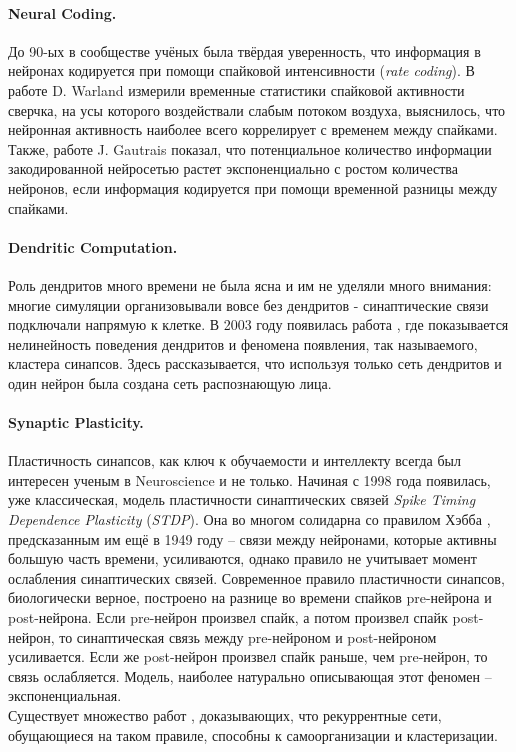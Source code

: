 \documentclass[a4paper,10pt]{article}
\begin{document}
\paragraph*{Neural Coding.} До 90-ых в сообществе учёных была твёрдая уверенность, что информация в нейронах кодируется при помощи спайковой интенсивности (\textit{rate coding}). В работе D. Warland \cite{time_cricket} измерили временные статистики спайковой активности сверчка, на усы которого воздействали слабым потоком воздуха, выяснилось, что нейронная активность наиболее всего коррелирует с временем между спайками. Также, работе J. Gautrais \cite{time_code} показал, что потенциальное количество информации закодированной нейросетью растет экспоненциально с ростом количества нейронов, если информация кодируется при помощи временной разницы между спайками.\\
\paragraph*{Dendritic Computation.}
Роль дендритов много времени не была ясна и им не уделяли много внимания: многие симуляции организовывали вовсе без дендритов - синаптические связи подключали напрямую к клетке. В 2003 году появилась работа \cite{dendr0}, где показывается нелинейность поведения дендритов и феномена появления, так называемого, кластера синапсов. Здесь \cite{dendr1} рассказывается, что используя только сеть дендритов и один нейрон была создана сеть распознающую лица.\\
\paragraph*{Synaptic Plasticity.}
Пластичность синапсов, как ключ к обучаемости и интеллекту всегда был интересен ученым в Neuroscience и не только. Начиная с 1998 года появилась, уже классическая, модель пластичности синаптических связей \cite{syn0} \textit{Spike Timing Dependence Plasticity} (\textit{STDP}). Она во многом солидарна со правилом Хэбба \cite{hebb}, предсказанным им ещё в 1949 году -- связи между нейронами, которые активны большую часть времени, усиливаются, однако правило не учитывает момент ослабления синаптических связей. Современное правило пластичности синапсов, биологически верное, построено на разнице во времени спайков pre-нейрона и post-нейрона. Если pre-нейрон произвел спайк, а потом произвел спайк post-нейрон, то синаптическая связь между pre-нейроном и post-нейроном усиливается. Если же post-нейрон произвел спайк раньше, чем pre-нейрон, то связь ослабляется. Модель, наиболее натурально описывающая этот феномен -- экспоненциальная.\\
\indent Существует множество работ \cite{syn1}\cite{syn2}\cite{syn3}, доказывающих, что рекуррентные сети, обущающиеся на таком правиле, способны к самоорганизации и кластеризации.
\end{document}
